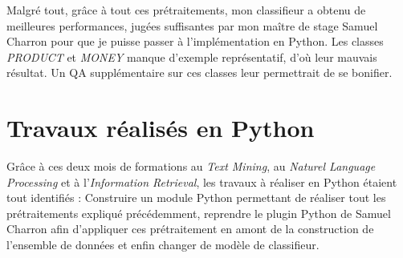                 Malgré tout, grâce à tout ces prétraitements, mon classifieur a obtenu de meilleures performances, jugées suffisantes par mon maître de stage Samuel Charron pour que je puisse passer à l'implémentation en Python. Les classes \textit{PRODUCT} et \textit{MONEY} manque d'exemple représentatif, d'où leur mauvais résultat. Un QA supplémentaire sur ces classes leur permettrait de se bonifier.

\section{Travaux réalisés en Python}
    Grâce à ces deux mois de formations au \textit{Text Mining}, au \textit{Naturel Language Processing} et à l'\textit{Information Retrieval}, les travaux à réaliser en Python étaient tout identifiés : Construire un module Python permettant de réaliser tout les prétraitements expliqué précédemment, reprendre le plugin Python de Samuel Charron afin d'appliquer ces prétraitement en amont de la construction de l'ensemble de données et enfin changer de modèle de classifieur.